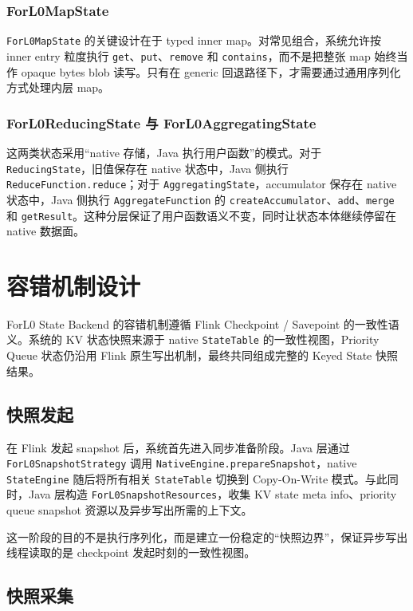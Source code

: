 \documentclass[a4paper,11pt]{article}
\newcommand{\project}{ForL0 State Backend}
\begin{document}
\subsubsection{ForL0MapState}

\texttt{ForL0MapState} 的关键设计在于 typed inner map。对常见组合，系统允许按 inner entry 粒度执行 \texttt{get}、\texttt{put}、\texttt{remove} 和 \texttt{contains}，而不是把整张 map 始终当作 opaque bytes blob 读写。只有在 generic 回退路径下，才需要通过通用序列化方式处理内层 map。

\subsubsection{ForL0ReducingState 与 ForL0AggregatingState}

这两类状态采用“native 存储，Java 执行用户函数”的模式。对于 \texttt{ReducingState}，旧值保存在 native 状态中，Java 侧执行 \texttt{ReduceFunction.reduce}；对于 \texttt{AggregatingState}，accumulator 保存在 native 状态中，Java 侧执行 \texttt{AggregateFunction} 的 \texttt{createAccumulator}、\texttt{add}、\texttt{merge} 和 \texttt{getResult}。这种分层保证了用户函数语义不变，同时让状态本体继续停留在 native 数据面。

\section{容错机制设计}

\project{} 的容错机制遵循 Flink Checkpoint / Savepoint 的一致性语义。系统的 KV 状态快照来源于 native \texttt{StateTable} 的一致性视图，Priority Queue 状态仍沿用 Flink 原生写出机制，最终共同组成完整的 Keyed State 快照结果。

\subsection{快照发起}

在 Flink 发起 snapshot 后，系统首先进入同步准备阶段。Java 层通过 \texttt{ForL0SnapshotStrategy} 调用 \texttt{NativeEngine.prepareSnapshot}，native \texttt{StateEngine} 随后将所有相关 \texttt{StateTable} 切换到 Copy-On-Write 模式。与此同时，Java 层构造 \texttt{ForL0SnapshotResources}，收集 KV state meta info、priority queue snapshot 资源以及异步写出所需的上下文。

这一阶段的目的不是执行序列化，而是建立一份稳定的“快照边界”，保证异步写出线程读取的是 checkpoint 发起时刻的一致性视图。

\subsection{快照采集}
\end{document}
